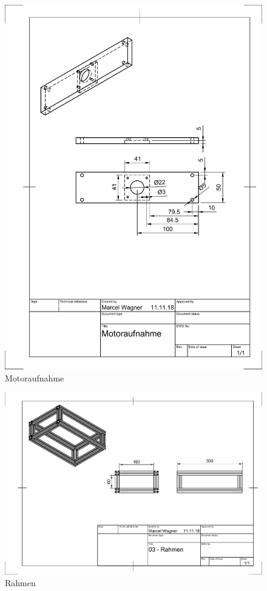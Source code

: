 \begin{figure}
	\centering
	\includegraphics[width=\textwidth]{images/Mechanik/Motoraufnahme}
	\caption{Motoraufnahme}
\end{figure}
\begin{figure}
	\centering
	\includegraphics[angle=90,origin=c, width=\textwidth]{images/Mechanik/Rahmen}
	\caption{Rahmen}
\end{figure}


